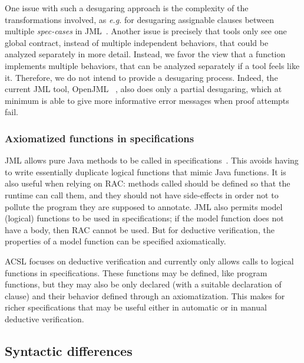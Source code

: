 One issue with such a desugaring approach is the complexity of the
transformations involved, as \emph{e.g.} for desugaring assignable clauses
between multiple \textit{spec-cases} in
JML~\cite{raghavan00desugaring}.  Another issue is precisely that
tools only see one global contract, instead of multiple independent
behaviors, that could be analyzed separately in more detail.
Instead, we favor the view that a function implements multiple
behaviors, that can be analyzed separately if a tool feels like
it. Therefore, we do not intend to provide a desugaring process.
Indeed, the current JML tool, OpenJML ~\cite{Cok-2011-OpenJML,Cok-2014-OpenJML}, also does only a partial desugaring, which at minimum is able to give more informative error messages when proof attempts fail.

\subsubsection*{Axiomatized functions in specifications}

JML allows pure Java methods to be called in
specifications~\cite{leavens00preliminary}. This avoids having
to write essentially duplicate logical functions that mimic Java functions. It is also useful when relying on RAC: methods called should be defined
so that the runtime can call them, and they should not have
side-effects in order not to pollute the program they are supposed to
annotate. 
JML also permits model (logical) functions to be
used in specifications; if the model function does not have
a body, then RAC cannot be used. But for deductive verification, 
the properties of a model function can be specified axiomatically.

ACSL focuses on deductive verification and currently only allows calls to logical functions in
specifications. These functions may be defined, like program functions, but
they may also be only declared (with a suitable declaration of \reads
clause) and their behavior defined through an axiomatization.
This makes for richer specifications that may be useful either in
automatic or in manual deductive verification.


\subsection{Syntactic differences}

